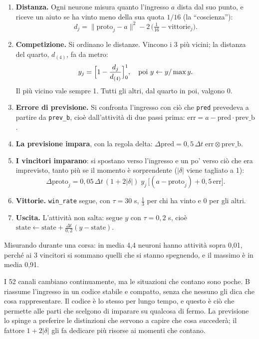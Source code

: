 \documentclass[11pt,a4paper]{article}
\newcommand{\voce}[1]{\par\smallskip\noindent{\bfseries\color{acc}#1}\par\nopagebreak}
\begin{document}
\voce{Come funziona, a ogni passo}
\begin{enumerate}
\item \textbf{Distanza.} Ogni neurone misura quanto l'ingresso $a$ dista dal suo punto, e riceve un aiuto
  se ha vinto meno della sua quota $1/16$ (la ``coscienza''):
\[
d_j=\lVert \text{proto}_j-a\rVert^2-2\,\bigl(\tfrac{1}{16}-\text{vittorie}_j\bigr).
\]
\item \textbf{Competizione.} Si ordinano le distanze. Vincono i 3 più vicini; la distanza del quarto,
  $d_{(4)}$, fa da metro:
\[
y_j=\Bigl[1-\frac{d_j}{d_{(4)}}\Bigr]_0^1,\quad\text{poi}\ y\leftarrow y/\max y.
\]
  Il più vicino vale sempre 1. Tutti gli altri, dal quarto in poi, valgono 0.
\item \textbf{Errore di previsione.} Si confronta l'ingresso con ciò che \texttt{pred} prevedeva a
  partire da \texttt{prev\_b}, cioè dall'attività di due passi prima: $\text{err}=a-\text{pred}\cdot\text{prev\_b}$.
\item \textbf{La previsione impara}, con la regola delta: $\Delta\text{pred}=0{,}5\,\Delta t\;\text{err}\otimes\text{prev\_b}$.
\item \textbf{I vincitori imparano}: si spostano verso l'ingresso e un po' verso ciò che era imprevisto,
  tanto più se il momento è sorprendente ($|\delta|$ viene tagliato a 1):
\[
\Delta\text{proto}_j=0{,}05\,\Delta t\,(1+2|\delta|)\;y_j\,\bigl[(a-\text{proto}_j)+0{,}5\,\text{err}\bigr].
\]
\item \textbf{Vittorie.} \texttt{win\_rate} segue, con $\tau=30$ s, $\frac13$ per chi ha vinto e 0 per gli altri.
\item \textbf{Uscita.} L'attività non salta: segue $y$ con $\tau=0{,}2$ s, cioè
  $\text{state}\leftarrow\text{state}+\frac{\Delta t}{0{,}2}(y-\text{state})$.
\end{enumerate}
Misurando durante una corsa: in media 4,4 neuroni hanno attività sopra 0,01, perché ai 3 vincitori
si sommano quelli che si stanno spegnendo, e il massimo è in media 0,91.

\voce{Perché serve}
I 52 canali cambiano continuamente, ma le situazioni che contano sono poche. B
riassume l'ingresso in un codice stabile e compatto, senza che nessuno gli dica che
cosa rappresentare. Il codice è lo stesso per lungo tempo, e questo è ciò che permette
alle parti che scelgono di imparare su qualcosa di fermo. La previsione lo spinge a
preferire le distinzioni che servono a capire che cosa succederà; il fattore
$1+2|\delta|$ gli fa dedicare più risorse ai momenti che contano.
\end{document}
